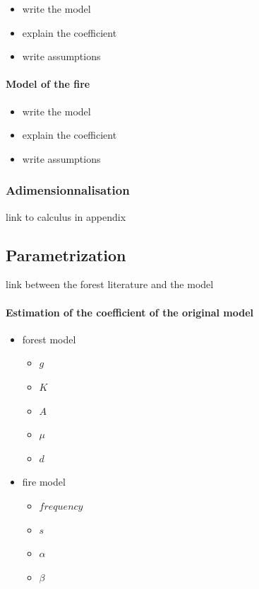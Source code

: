 \documentclass{article}
\begin{document}
\begin{itemize}
    \item write the model 
    \item explain the coefficient
    \item write assumptions
\end{itemize}

\paragraph{Model of the fire}

\begin{itemize}
    \item write the model
    \item explain the coefficient
    \item write assumptions
\end{itemize}


\subsubsection{Adimensionnalisation}


link to calculus in appendix    





\subsection{Parametrization}

link between the forest literature and the model

\paragraph{Estimation of the coefficient of the original model}

\begin{itemize}
    \item forest model
    \begin{itemize}
        \item $g$
        \item $K$
        \item $A$
        \item $\mu$
        \item $d$
    \end{itemize}
    \item fire model
    \begin{itemize}
        \item $frequency$
        \item $s$
        \item $\alpha$
        \item $\beta$
    \end{itemize}
\end{itemize}
\end{document}
